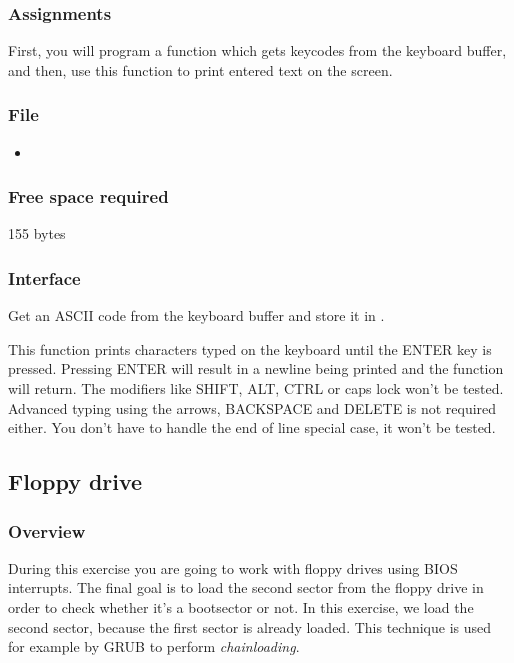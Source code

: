 \subsubsection*{Assignments}
First, you will program a function which gets keycodes from the keyboard
buffer, and then, use this function to print entered text on the screen.

\subsubsection*{File}
\begin{itemize}
  \item {}
\end{itemize}

\subsubsection*{Free space required}
155 bytes

\subsubsection*{Interface}
{
  Get an ASCII code from the keyboard buffer and store it in .
}

{
  This function prints characters typed on the keyboard until the ENTER key
  is pressed. Pressing ENTER will result in a newline being printed and the
  function will return.
  The modifiers like SHIFT, ALT, CTRL or caps lock won't be tested. Advanced
  typing using the arrows, BACKSPACE and DELETE is not required either.
  You don't have to handle the end of line special case, it won't be tested.
}

%
%

\newpage

\subsection{Floppy drive}

\subsubsection*{Overview}
During this exercise you are going to work with floppy drives using BIOS
interrupts. The final goal is to load the second sector from the floppy drive
in order to check whether it's a bootsector or not. In this exercise, we load the
second sector, because the first sector is already loaded. This technique is used
for example by GRUB to perform \emph{chainloading}.

